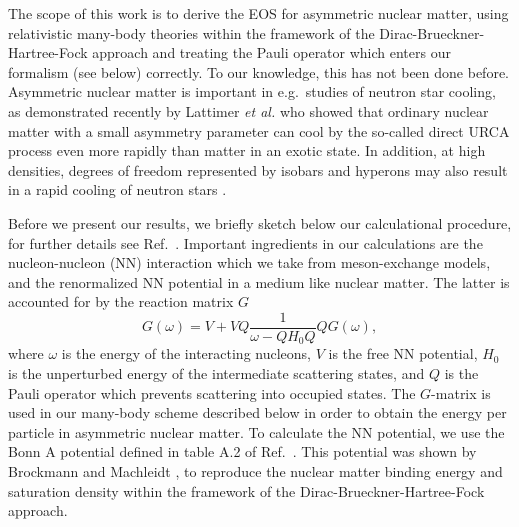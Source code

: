 The scope of this work is to derive the EOS for asymmetric nuclear
matter, using relativistic many-body theories within the
framework of the Dirac-Brueckner-Hartree-Fock approach
\cite{cs86,bm90} and treating the Pauli operator which enters
our formalism (see below) correctly. To our knowledge, this has 
not been done before. 
Asymmetric nuclear matter is important in e.g.\ studies of neutron
star cooling, as demonstrated recently by Lattimer {\em et al.}
\cite{lpph91} who showed that ordinary nuclear matter
with a small asymmetry parameter can cool by the so-called
direct URCA process even more rapidly than matter in an exotic state.
In addition, at high densities, degrees of freedom represented by
isobars and hyperons may also result in a rapid cooling of neutron stars
\cite{pplp92}. 

Before we present our results, we briefly sketch below our calculational
procedure, for further details see Ref.\ \cite{behoo94}.
Important
ingredients in our calculations are the nucleon-nucleon (NN)
interaction which we take from meson-exchange models, and the
renormalized NN potential in a medium like nuclear matter.
The latter is accounted for by  the reaction
matrix $G$
\begin{equation}
   G(\omega )=V+VQ\frac{1}{\omega - QH_0Q}QG(\omega ),
   \label{eq:bg}
\end{equation}
where $\omega$ is the energy of the interacting  nucleons,
$V$ is the free NN potential, $H_0$ is the unperturbed energy of the
intermediate scattering states,
and $Q$ is the Pauli
operator which prevents scattering into occupied states.
The $G$-matrix is used in our many-body scheme described
below in order to obtain the energy per particle in asymmetric
nuclear matter. 
To calculate the NN potential, we use the Bonn A potential defined
in table A.2 of Ref.\ \cite{mac89}. This potential was shown by Brockmann
and Machleidt \cite{bm90}, 
to reproduce the nuclear matter binding energy and saturation density
within the framework of the Dirac-Brueckner-Hartree-Fock approach.



